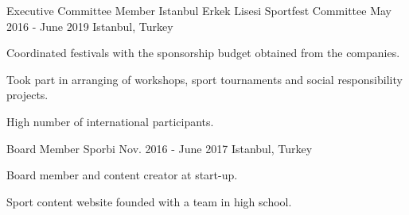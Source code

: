
\begin{cventries}

  \cventry
    {Executive Committee Member}
    {Istanbul Erkek Lisesi Sportfest Committee}
    {May 2016 - June 2019}
    {Istanbul, Turkey}
    {
    \begin{cvitems}
        \item {Coordinated festivals with the sponsorship budget obtained from the companies.}
        \item {Took part in arranging of workshops, sport tournaments and social responsibility projects.}
        \item {High number of international participants.}
    \end{cvitems}
    }

  \cventry
    {Board Member}
    {Sporbi}
    {Nov. 2016 - June 2017}
    {Istanbul, Turkey}
    {
      \begin{cvitems}
        \item {Board member and content creator at start-up.}
        \item {Sport content website founded with a team in high school.}
      \end{cvitems}
    }

\end{cventries}
